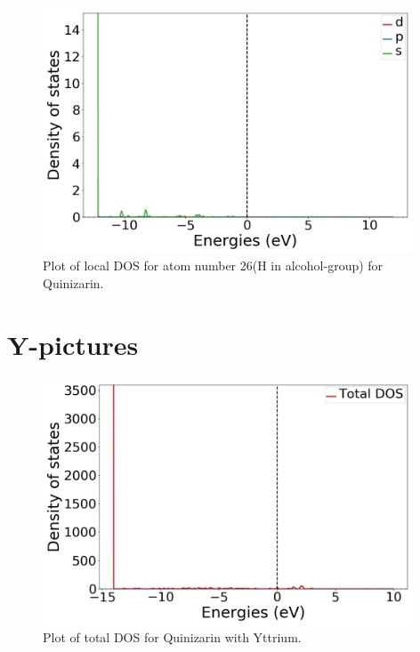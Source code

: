 \documentclass{article}
\begin{document}
  \begin{figure}[H]
      \centering
      \includegraphics[width = 11cm]{../fig/basic_LDOS26_1.png}
      \caption{Plot of local DOS for atom number 26(H in alcohol-group) for Quinizarin. }
      \label{fig:basic_LDOS26_1}
  \end{figure}

\vspace{1cm}

\section{Y-pictures}

  \begin{figure}[H]
      \centering
      \includegraphics[width = 11cm]{../fig/Y_TDOS_1.png}
      \caption{Plot of total DOS for Quinizarin with Yttrium. }
      \label{fig:Y_TDOS_1}
  \end{figure}
\end{document}
